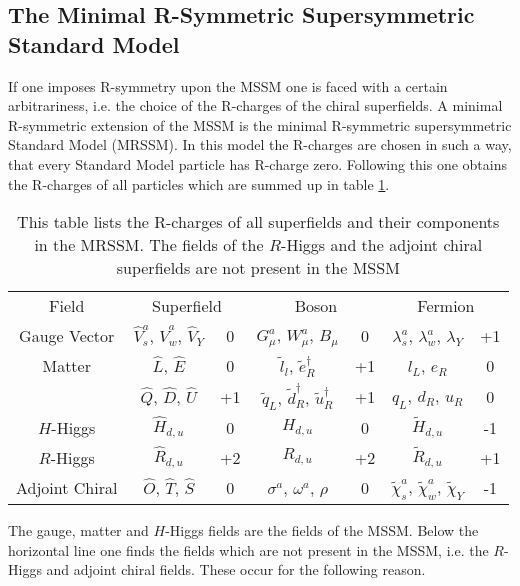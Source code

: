 \subsection{The Minimal R-Symmetric Supersymmetric Standard Model}
If one imposes R-symmetry upon the MSSM one is faced with a certain arbitrariness, i.e. the choice of the R-charges of the chiral superfields. A minimal R-symmetric extension of the MSSM is the minimal R-symmetric supersymmetric Standard Model (MRSSM)\cite{Kribs:2007ac}. In this model the R-charges are chosen in such a way, that every Standard Model particle has R-charge zero. Following this one obtains the R-charges of all particles which are summed up in table \ref{tab:R_charges_MRSSM}.
\begin{table}[H]
\begin{center}
\begin{tabular}{c||c|c||c|c||c|c}
Field & \multicolumn{2}{c||}{Superfield} & \multicolumn{2}{c||}{Boson} & \multicolumn{2}{c}{Fermion} \\
\hhline{=#=|=#=|=#=|=}
Gauge Vector & $\hat{V}_s^a$, $\hat{V}_w^a$, $\hat{V}_Y$ & 0 & $G^a_\mu$, $W^a_\mu$, $B_\mu$ & 0 & $\lambda_s^a$, $\lambda_w^a$, $\lambda_Y$ &+1\\
Matter & $\hat{L}$, $\hat{E}$ & 0 & $\tilde{l}_l$, $\tilde{e}^\dagger_R$ & +1 & $l_L$, $e_R$ & 0\\
 & $\hat{Q}$, $\hat{D}$, $\hat{U}$ & +1 & $\tilde{q}_L$, $\tilde{d}^\dagger_R$, $\tilde{u}^\dagger_R$ & +1 & $q_L$, $d_R$, $u_R$ & 0\\
$H$-Higgs & $\hat{H}_{d,u}$ & 0 & $H_{d,u}$ & 0 & $\tilde{H}_{d,u}$ & -1\\
\hline
$R$-Higgs & $\hat{R}_{d,u}$ & +2 & $R_{d,u}$ & +2 & $\tilde{R}_{d,u}$ & +1\\
Adjoint Chiral & $\hat{O}$, $\hat{T}$, $\hat{S}$ & 0 & $\sigma^a$, $\omega^a$, $\rho$ & 0 & $\tilde{\chi}_s^a$, $\tilde{\chi}_w^a$, $\tilde{\chi}_Y$ & -1
\end{tabular}
\caption{This table lists the R-charges of all superfields and their components in the MRSSM. The fields of the $R$-Higgs and the adjoint chiral superfields are not present in the MSSM}\label{tab:R_charges_MRSSM}
\end{center}
\end{table}
The gauge, matter and $H$-Higgs fields are the fields of the MSSM. Below the horizontal line one finds the fields which are not present in the MSSM, i.e. the $R$-Higgs and adjoint chiral fields. These occur for the following reason.\\
